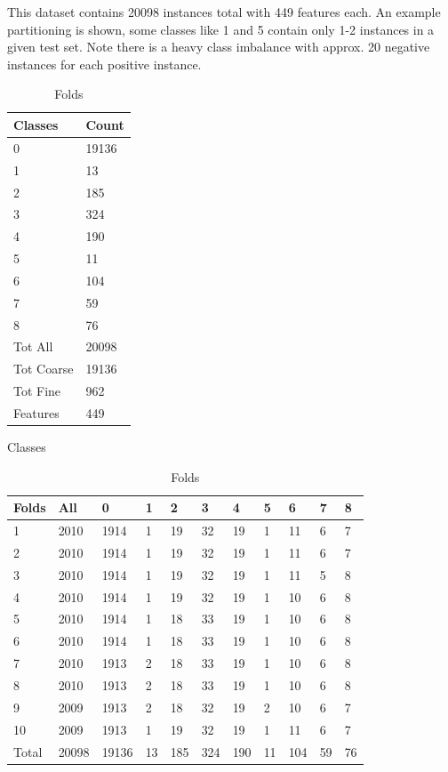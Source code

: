 \documentclass[ms]{nuthesis}
\begin{document}
\FloatBarrier
\begin{table}[!htb]
\centering
  \caption{This dataset contains 20098 instances total with 449 features each. An example partitioning is shown, some classes
  like 1 and 5 contain only 1-2 instances in a given test set. Note there is a heavy class imbalance with approx. 20 negative
  instances for each positive instance.}
  \label{tab:dataset}
\begin{subtable}{.25\linewidth}
  \centering
  \begin{tabular}{|l||l|}\toprule
    Classes & Count \\ \midrule
    0 & 19136 \\
    1 & 13 \\
    2 & 185 \\
    3 & 324 \\
    4 & 190 \\
    5 & 11 \\
    6 & 104 \\
    7 & 59 \\
    8 & 76 \\ \midrule
    Tot All & 20098 \\
    Tot Coarse & 19136 \\
    Tot Fine & 962 \\
    Features & 449 \\ \bottomrule
  \end{tabular}
  \caption{Classes}
  \label{tab:ClassesAll}
\end{subtable}%
\begin{subtable}{.75\linewidth}
\centering
  \begin{tabular}{|l||l||l||l||l||l||l||l||l||l||l|}\toprule
    Folds & All & 0 & 1 & 2 & 3 & 4 & 5 & 6 & 7 & 8 \\ \midrule
    1 & 2010 & 1914 & 1 & 19 & 32 & 19 & 1 & 11 & 6 & 7 \\
    2 & 2010 & 1914 & 1 & 19 & 32 & 19 & 1 & 11 & 6 & 7 \\
    3 & 2010 & 1914 & 1 & 19 & 32 & 19 & 1 & 11 & 5 & 8 \\
    4 & 2010 & 1914 & 1 & 19 & 32 & 19 & 1 & 10 & 6 & 8 \\
    5 & 2010 & 1914 & 1 & 18 & 33 & 19 & 1 & 10 & 6 & 8 \\
    6 & 2010 & 1914 & 1 & 18 & 33 & 19 & 1 & 10 & 6 & 8 \\
    7 & 2010 & 1913 & 2 & 18 & 33 & 19 & 1 & 10 & 6 & 8 \\
    8 & 2010 & 1913 & 2 & 18 & 33 & 19 & 1 & 10 & 6 & 8 \\
    9 & 2009 & 1913 & 2 & 18 & 32 & 19 & 2 & 10 & 6 & 7 \\
    10 & 2009 & 1913 & 1 & 19 & 32 & 19 & 1 & 11 & 6 & 7 \\ \midrule
    Total & 20098 & 19136 & 13 & 185 & 324 & 190 & 11 & 104 & 59 & 76 \\
 \bottomrule
  \end{tabular}
  \caption{Folds}
  \label{tab:partitions}
  \end{subtable}
\end{table}
\FloatBarrier
\end{document}
